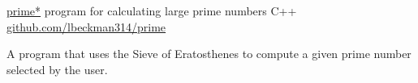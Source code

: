 \showoff
{\href{https://liambeckman.com/code/prime}{prime*}}
{program for calculating large prime numbers}
{C++}
{\href{https://github.com/lbeckman314/prime}{github.com/lbeckman314/prime}}

A program that uses the Sieve of Eratosthenes to compute a given prime number selected by the user.

\myBreak

